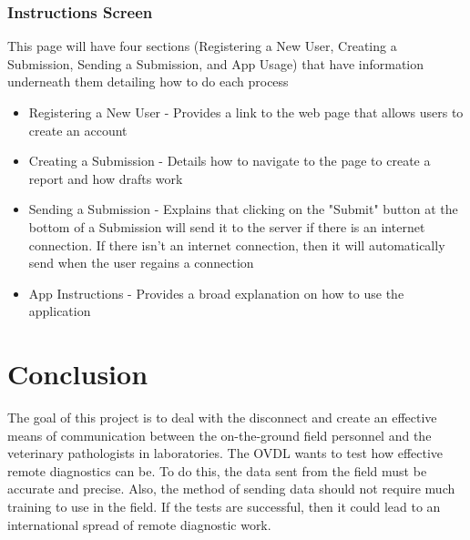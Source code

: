 \documentclass[onecolumn, draftclsnofoot,10pt, compsoc]{IEEEtran}
\begin{document}
\subsubsection{Instructions Screen}
This page will have four sections (Registering a New User, Creating a Submission, Sending a Submission, and App Usage) that have information underneath them detailing how to do each process
\begin{itemize}

\item Registering a New User - Provides a link to the web page that allows users to create an account
\item Creating a Submission - Details how to navigate to the page to create a report and how drafts work 
\item Sending a Submission - Explains that clicking on the "Submit" button at the bottom of a Submission will send it to the server if there is an internet connection. If there isn't an internet connection, then it will automatically send when the user regains a connection 
\item App Instructions - Provides a broad explanation on how to use the application
\end{itemize}

\section{Conclusion}
The goal of this project is to deal with the disconnect and create an effective means of communication between the on-the-ground field personnel and the veterinary pathologists in laboratories. The OVDL wants to test how effective remote diagnostics can be. To do this, the data sent from the field must be accurate and precise. Also, the method of sending data should not require much training to use in the field. If the tests are successful, then it could lead to an international spread of remote diagnostic work. 
\end{document}
